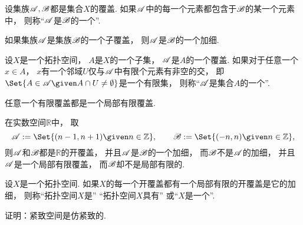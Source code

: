 \begin{definition}
设集族\(\mathscr{A},\mathscr{B}\)都是集合\(X\)的覆盖.
如果\(\mathscr{A}\)中的每一个元素都包含于\(\mathscr{B}\)的某一个元素中，
则称“\(\mathscr{A}\)是\(\mathscr{B}\)的一个”.
\end{definition}

\begin{proposition}
如果集族\(\mathscr{A}\)是集族\(\mathscr{B}\)的一个子覆盖，
则\(\mathscr{A}\)是\(\mathscr{B}\)的一个加细.
\end{proposition}

\begin{definition}
设\(X\)是一个拓扑空间，
\(A\)是\(X\)的一个子集，
\(\mathscr{A}\)是\(A\)的一个覆盖.
如果对于任意一个\(x \in A\)，
\(x\)有一个邻域\(U\)仅与\(\mathscr{A}\)中有限个元素有非空的交，
即\(\Set{
	A \in \sfA
	\given
	A \cap U \neq \emptyset
}\)是一个有限集，
则称“\(\mathscr{A}\)是集合\(A\)的一个”.
\end{definition}

\begin{proposition}
任意一个有限覆盖都是一个局部有限覆盖.
\end{proposition}

\begin{example}
在实数空间\(\mathbb{R}\)中，
取\begin{equation*}
	\sfA \defeq \Set{
		(n-1,n+1)
		\given
		n\in\mathbb{Z}
	},
	\qquad
	\sfB \defeq \Set{
		(-n,n)
		\given
		n\in\mathbb{Z}
	},
\end{equation*}
则\(\mathscr{A}\)和\(\mathscr{B}\)都是\(\mathbb{R}\)的开覆盖，
并且\(\mathscr{A}\)是\(\mathscr{B}\)的一个加细，
而\(\mathscr{B}\)不是\(\mathscr{A}\)的加细，
并且\(\mathscr{A}\)是一个局部有限覆盖，
而\(\mathscr{B}\)却不是局部有限的.
\end{example}

\begin{definition}
设\(X\)是一个拓扑空间.
如果\(X\)的每一个开覆盖都有一个局部有限的开覆盖是它的加细，
则称“拓扑空间\(X\)是”
“拓扑空间\(X\)具有”
或“\(X\)是一个”.
\end{definition}

\begin{example}
证明：紧致空间是仿紧致的.
\end{example}


